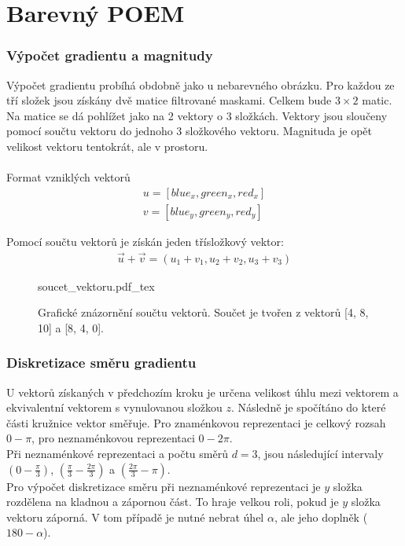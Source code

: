 \documentclass[czech,BP]{thesiskiv}
\begin{document}
\section{Barevný POEM}
\subsubsection{Výpočet gradientu a magnitudy}
Výpočet gradientu probíhá obdobně jako u nebarevného obrázku. Pro každou ze tří složek jsou získány dvě matice filtrované maskami. Celkem bude $3 \times 2$ matic. Na matice se dá pohlížet jako na 2 vektory o 3 složkách. Vektory jsou sloučeny pomocí součtu vektoru do jednoho 3 složkového vektoru. Magnituda je opět velikost vektoru tentokrát, ale v prostoru. \\
\\
Format vzniklých vektorů 
\begin{align}
	\label{barevny_poem_vznikle_vektory}
			 u = [blue_x, green_x, red_x] \\
			 v = [blue_y, green_y, red_y]
\end{align}

Pomocí součtu vektorů je získán jeden třísložkový vektor:
\begin{align}
   \label{soucet_vektrou} \vec{u} + \vec{v} = (u_1 + v_1, u_2 + v_2, u_3 + v_3 )
\end{align} 

\begin{figure}[H]
    \centering
    \def\svgwidth{\columnwidth}
    {soucet_vektoru.pdf_tex} 
    \caption{Grafické znázornění součtu vektorů. Součet je tvořen z vektorů [4, 8, 10] a [8, 4, 0].}
\end{figure}

\subsubsection{Diskretizace směru gradientu}
U vektorů získaných v předchozím kroku je určena velikost úhlu mezi vektorem a ekvivalentní vektorem s vynulovanou složkou $z$. Následně je spočítáno do které části kružnice vektor směřuje. Pro znaménkovou reprezentaci je celkový rozsah $0 - \pi$, pro neznaménkovou reprezentaci $0 - 2\pi$.
\\
Při neznaménkové reprezentaci a počtu směrů $d = 3$, jsou následující intervaly $\left(0 - \frac{\pi}{3}\right)$, $\left(\frac{\pi}{3} - \frac{2\pi}{3}\right)$ a  $\left(\frac{2\pi}{3} - \pi\right)$.
\\
Pro výpočet diskretizace směru při neznaménkové reprezentaci je $y$ složka rozdělena na kladnou a zápornou část. To hraje velkou roli, pokud je $y$ složka vektoru záporná. V tom případě je nutné nebrat úhel $\alpha$, ale jeho doplněk ($ 180 - \alpha$).
\end{document}
